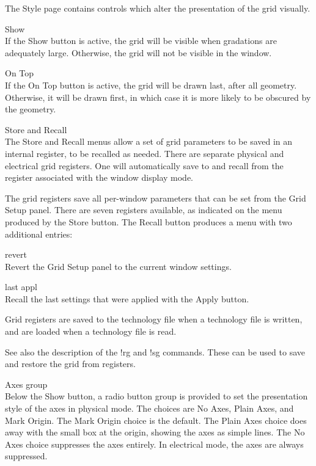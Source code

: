 The {\cb Style} page contains controls which alter the presentation of
the grid visually.

\begin{description}
\item{\cb Show}\\
If the {\cb Show} button is active, the grid will be visible when
gradations are adequately large.  Otherwise, the grid will not be
visible in the window.

\item{\cb On Top}\\
If the {\cb On Top} button is active, the grid will be drawn last,
after all geometry.  Otherwise, it will be drawn first, in which case
it is more likely to be obscured by the geometry.

\item{\cb Store} and {\cb Recall}\\
The {\cb Store} and {\cb Recall} menus allow a set of grid parameters
to be saved in an internal register, to be recalled as needed.  There
are separate physical and electrical grid registers.  One will
automatically save to and recall from the register associated with the
window display mode.

The grid registers save all per-window parameters that can be set from
the {\cb Grid Setup} panel.  There are seven registers available, as
indicated on the menu produced by the {\cb Store} button.  The {\cb
Recall} button produces a menu with two additional entries:

\begin{description}
\item{\cb revert}\\
Revert the {\cb Grid Setup} panel to the current window settings.

\item{\cb last appl}\\
Recall the last settings that were applied with the {\cb Apply}
button.
\end{description}

Grid registers are saved to the technology file when a technology file
is written, and are loaded when a technology file is read.

See also the description of the {\cb !rg} and {\cb !sg} commands. 
These can be used to save and restore the grid from registers.

\item{\cb Axes} group\\
Below the {\cb Show} button, a radio button group is provided to set
the presentation style of the axes in physical mode.  The choices are
{\cb No Axes}, {\cb Plain Axes}, and {\cb Mark Origin}.  The {\cb Mark
Origin} choice is the default.  The {\cb Plain Axes} choice does away
with the small box at the origin, showing the axes as simple lines. 
The {\cb No Axes} choice suppresses the axes entirely.  In electrical
mode, the axes are always suppressed.


\end{description}
